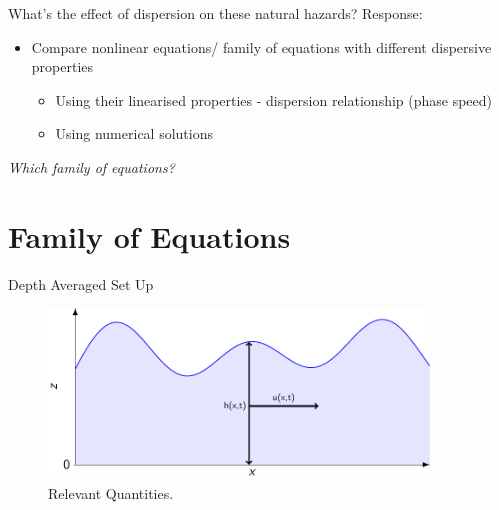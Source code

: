\documentclass[pdf]{beamer}
\begin{document}
\begin{frame}{What's the effect of dispersion on these natural hazards?}
Response:
\begin{itemize}
	\item Compare nonlinear equations/ family of equations with different dispersive properties
	\begin{itemize}
	\item Using their linearised properties - dispersion relationship (phase speed)
	\item Using numerical solutions
	\end{itemize}
\end{itemize}
\bigskip
\pause
\emph{Which family of equations?}
\end{frame}


\section{Family of Equations}
\begin{frame}{Depth Averaged Set Up}
\begin{figure}
	\centering
	\includegraphics[width=0.9\textwidth]{./Pics/Tex/Explanatory/Setupplot/Waves.pdf}
	\caption{Relevant Quantities.}
\end{figure}
\end{frame}
\end{document}

